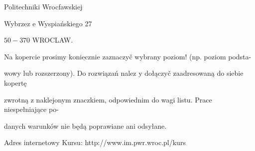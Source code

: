 \documentclass[a4paper,12pt]{article}
\begin{document}
Politechniki Wrocfawskiej

Wybrzez $\mathrm{e}$ Wyspiańskiego 27

$50-370$ WROCLAW.

Na kopercie prosimy $\underline{\mathrm{k}\mathrm{o}\mathrm{n}\mathrm{i}\mathrm{e}\mathrm{c}\mathrm{z}\mathrm{n}\mathrm{i}\mathrm{e}}$ zaznaczyč wybrany poziom! (np. poziom podsta-

wowy lub rozszerzony). Do rozwiązań nalez $\mathrm{y}$ dołączyč zaadresowaną do siebie kopertę

zwrotną $\mathrm{z}$ naklejonym znaczkiem, odpowiednim do wagi listu. Prace niespełniające po-

danych warunków nie będą poprawiane ani odsyłane.

Adres internetowy Kursu: http://www.im.pwr.wroc.pl/kurs
\end{document}
